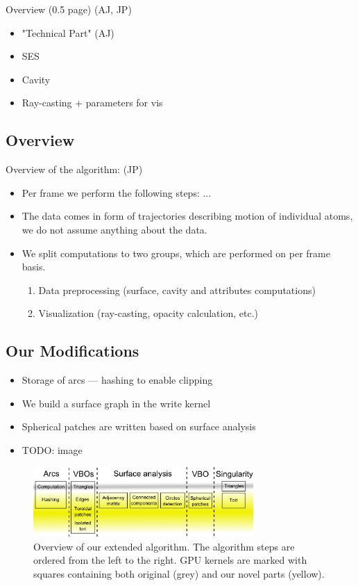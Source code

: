 Overview (0.5 page) (AJ, JP)
\begin{itemize}
  \item "Technical Part" (AJ)
  \item SES
  \item Cavity
  \item Ray-casting + parameters for vis
\end{itemize}

\subsection{Overview}
Overview of the algorithm: (JP)
\begin{itemize}
  \item Per frame we perform the following steps: ...
  \item The data comes in form of trajectories describing motion of individual atoms, we do not assume anything about the data.
  \item We split computations to two groups, which are performed on per frame basis.
	\begin{enumerate}
	  \item Data preprocessing (surface, cavity and attributes computations)
		\item Visualization  (ray-casting, opacity calculation, etc.)
	\end{enumerate}
\end{itemize}

\subsection{Our Modifications}
\begin{itemize}
  \item Storage of arcs --- hashing to enable clipping
	\item We build a surface graph in the write kernel
	\item Spherical patches are written based on surface analysis
	\item TODO: image
\end{itemize}

\begin{figure}[htb]
  \centering
  \includegraphics[width=3.3in]{image/kernels.png}
  \caption{Overview of our extended algorithm.
	The algorithm steps are ordered from the left to the right.
	GPU kernels are marked with squares containing both original (grey) and our novel parts (yellow).}
	\label{fig:kernels}
\end{figure}

